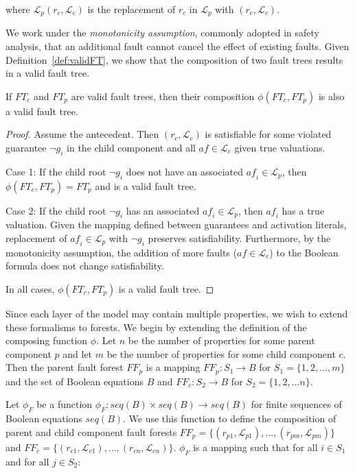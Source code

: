 where $\mathcal{L}_p(r_c, \mathcal{L}_c)$ is the replacement of $r_c$ in $\mathcal{L}_p$ with $(r_c, \mathcal{L}_c)$.

We work under the {\em monotonicity assumption}, commonly adopted in safety analysis, that an additional fault cannot cancel the effect of existing faults. Given Definition~\ref{def:validFT}, we show that the composition of two fault trees results in a valid fault tree. 

\begin{lemma} If $\mathit{FT}_c$ and $\mathit{FT}_p$ are valid fault trees, then their composition $\phi(\mathit{FT}_c, \mathit{FT}_p)$ is also a valid fault tree. 
\begin{proof}
Assume the antecedent. Then $(r_c, \mathcal{L}_c)$ is satisfiable for some violated guarantee $\neg g_i$ in the child component and all $\mathit{af} \in \mathcal{L}_c$ given true valuations. 

Case 1: If the child root $\neg g_i$ does not have an associated $\mathit{af_i} \in \mathcal{L}_p$, then $\phi(\mathit{FT}_c, \mathit{FT}_p) = \mathit{FT}_p$ and is a valid fault tree.

Case 2: If the child root $\neg g_i$ has an associated $\mathit{af_i} \in \mathcal{L}_p$, then $\mathit{af_i}$ has a true valuation. Given the mapping defined between guarantees and activation literals, replacement of $\mathit{af_i} \in \mathcal{L}_p$ with $\neg g_i$ preserves satisfiability. Furthermore, by the monotonicity assumption, the addition of more faults ($\mathit{af} \in \mathcal{L}_c$) to the Boolean formula does not change satisfiability. 

In all cases, $\phi(\mathit{FT}_c, \mathit{FT}_p)$ is a valid fault tree. 
\end{proof}
\label{lemma:validTree}
\end{lemma}

Since each layer of the model may contain multiple properties, we wish to extend these formalisms to forests. We begin by extending the definition of the composing function $\phi$. Let $n$ be the number of properties for some parent component $p$ and let $m$ be the number of properties for some child component $c$. Then the parent fault forest $\mathit{FF}_p$ is a mapping $\mathit{FF}_p : S_1 \rightarrow B$ for $S_1 = \{1,2,\dots,m\}$ and the set of Boolean equations $B$ and $\mathit{FF}_c: S_2 \rightarrow B$ for $S_2 = \{1,2,\dots n\}$. 

Let $\phi_F$ be a function $\phi _F: \mathit{seq(B)} \times \mathit{seq(B)} \rightarrow \mathit{seq(B)}$ for finite sequences of Boolean equations $\mathit{seq(B)}$. We use this function to define the composition of parent and child component fault forests $\mathit{FF}_p = \{(r_{p1},\mathcal{L}_{p1}), \dots, (r_ {pm}, \mathcal{L}_{pm})\}$ and $\mathit{FF}_c = \{(r_{c1},\mathcal{L}_{c1}), \dots, (r_ {cn}, \mathcal{L}_{cn})\}$. $\phi_F$ is a mapping such that for all $i \in S_1$ and for all $j \in S_2$: 

